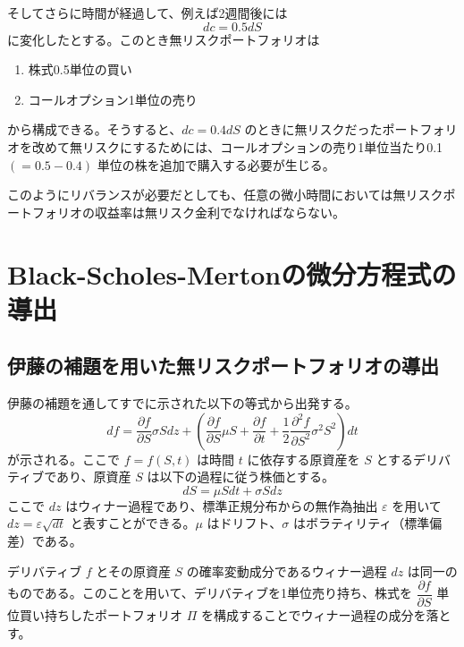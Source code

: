 \documentclass[uplatex]{jsarticle}
\begin{document}
そしてさらに時間が経過して、例えば2週間後には
$$
	dc = 0.5 dS
$$
に変化したとする。このとき無リスクポートフォリオは
\begin{enumerate}
	\item 株式0.5単位の買い
	\item コールオプション1単位の売り
\end{enumerate}
から構成できる。そうすると、$dc = 0.4 dS$ のときに無リスクだったポートフォリオを改めて無リスクにするためには、コールオプションの売り1単位当たり0.1 $(=0.5-0.4)$ 単位の株を追加で購入する必要が生じる。

このようにリバランスが必要だとしても、任意の微小時間においては無リスクポートフォリオの収益率は無リスク金利でなければならない。

\section{Black-Scholes-Mertonの微分方程式の導出}

\subsection{伊藤の補題を用いた無リスクポートフォリオの導出}

伊藤の補題を通してすでに示された以下の等式から出発する。
$$
	df = \dfrac{\partial f}{\partial S} \sigma S dz + \left( \dfrac{\partial f}{\partial S} \mu S + \dfrac{\partial f}{\partial t} + \dfrac{1}{2} \dfrac{\partial^{2} f}{\partial S^{2}} \sigma^{2} S^{2} \right) dt
$$
が示される。ここで $f=f(S,t)$ は時間 $t$ に依存する原資産を $S$ とするデリバティブであり、原資産 $S$ は以下の過程に従う株価とする。
$$
	dS = \mu S dt + \sigma S dz
$$
ここで $dz$ はウィナー過程であり、標準正規分布からの無作為抽出 $\varepsilon$ を用いて $dz = \varepsilon \sqrt{dt}$ と表すことができる。$\mu$ はドリフト、$\sigma$ はボラティリティ（標準偏差）である。

\bigskip

デリバティブ $f$ とその原資産 $S$ の確率変動成分であるウィナー過程 $dz$ は同一のものである。このことを用いて、デリバティブを1単位売り持ち、株式を $\dfrac{\partial f}{\partial S}$ 単位買い持ちしたポートフォリオ $\Pi$ を構成することでウィナー過程の成分を落とす。
\end{document}
